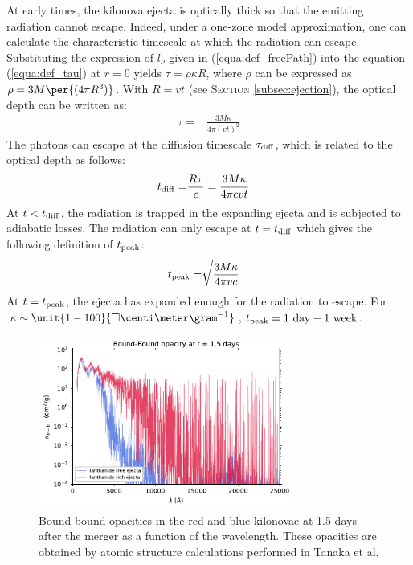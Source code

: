 \documentclass[a4paper, twoside, 11pt]{article}
\numberwithin{equation}{section}
\begin{document}
At early times, the kilonova ejecta is optically thick so that the emitting radiation cannot escape. Indeed, under a one-zone model approximation, one can calculate the characteristic timescale at which the radiation can escape. Substituting the expression of $l_\nu$ given in (\ref{equa:def_freePath}) into the equation (\ref{equa:def_tau}) at $r=0$ yields \(\tau = \rho \kappa R\), where $\rho$ can be expressed as \(\rho ={3M}\per{(4\pi R^3)} \). With $R=vt$ (see S\textsc{ection} \ref{subsec:ejection}), the optical depth can be written as:
\begin{align}
\tau =& \frac{3M\kappa}{4\pi(vt)^2}
\end{align}
The photons can escape at the diffusion timescale $\tau_{\rm{diff}}$, which is related to the optical depth as follows: 
\begin{align}
t_{\rm{diff}}  =& \frac{R\tau}{c}  = \frac{3M\kappa}{4\pi c v t } 
\end{align}
At $t<t_{\rm{diff}}$, the radiation is trapped in the expanding ejecta and is subjected to adiabatic losses\cite{Nakar}. The radiation can only escape at $t=t_{\rm{diff}}$ which gives the following definition of $t_{\rm{peak}}$:
\begin{align}
t_{\rm{peak}}=& \sqrt{\frac{3M\kappa}{4\pi v c }}
\label{equa:tpeak}
\end{align}
At $t = t_{\rm{peak}}$, the ejecta has expanded enough for the radiation to escape. 
For $\kappa \sim \unit{1-100}{\square{\centi\meter}\gram^{-1}}$, $t_{\rm{peak}}=1\ \rm{day}-1\  \rm{week}$. \\
\begin{figure}[h!]
\centering
\includegraphics[width=0.75\textwidth]{pictures/opac_tanaka_t1.pdf}
\caption[Line transitions in r-process material]{Bound-bound opacities in the red and blue kilonovae  at 1.5 days after the merger as a function of the wavelength. These opacities are obtained by atomic structure calculations performed in Tanaka et al. \cite{tanaka}} %
\label{fig:opac_tanaka}
\end{figure}
\end{document}
